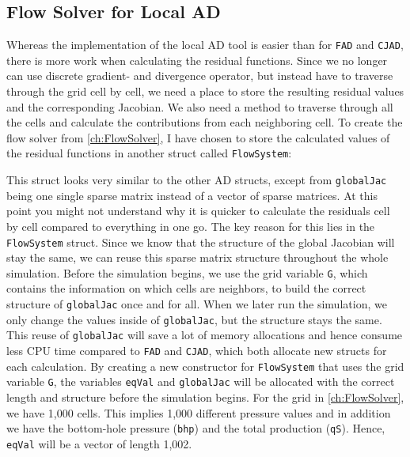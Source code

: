 \subsection{Flow Solver for Local AD}
\label{sec:FlowSolverLADImplementation}
Whereas the implementation of the local AD tool is easier than for \texttt{FAD} and \texttt{CJAD}, there is more work when calculating the residual functions. Since we no longer can use discrete gradient- and divergence operator, but instead have to traverse through the grid cell by cell, we need a place to store the resulting residual values and the corresponding Jacobian. We also need a method to traverse through all the cells and calculate the contributions from each neighboring cell. To create the flow solver from \autoref{ch:FlowSolver}, I have chosen to store the calculated values of the residual functions in another struct called \texttt{FlowSystem}:

This struct looks very similar to the other AD structs, except from \texttt{globalJac} being one single sparse matrix instead of a vector of sparse matrices. At this point you might not understand why it is quicker to calculate the residuals cell by cell compared to everything in one go. The key reason for this lies in the \texttt{FlowSystem} struct. Since we know that the structure of the global Jacobian will stay the same, we can reuse this sparse matrix structure throughout the whole simulation. Before the simulation begins, we use the grid variable \texttt{G}, which contains the information on which cells are neighbors, to build the correct structure of \texttt{globalJac} once and for all. When we later run the simulation, we only change the values inside of \texttt{globalJac}, but the structure stays the same. This reuse of \texttt{globalJac} will save a lot of memory allocations and hence consume less CPU time compared to \texttt{FAD} and \texttt{CJAD}, which both allocate new structs for each calculation. By creating a new constructor for \texttt{FlowSystem} that uses the grid variable \texttt{G}, the variables \texttt{eqVal} and \texttt{globalJac} will be allocated with the correct length and structure before the simulation begins. For the grid in \autoref{ch:FlowSolver}, we have 1,000 cells. This implies 1,000 different pressure values and in addition we have the bottom-hole pressure (\texttt{bhp}) and the total production (\texttt{qS}). Hence, \texttt{eqVal} will be a vector of length 1,002.

